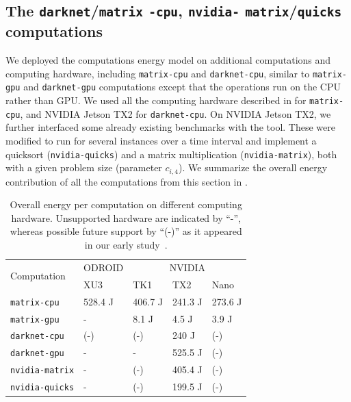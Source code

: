 \subsection{The {\tt darknet}/{\tt matrix} {\tt -cpu}, {\tt nvidia-} {\tt matrix}/{\tt quicks} computations}

We deployed the computations energy model on additional computations and computing hardware, including {\small\tt matrix-cpu} and {\small\tt darknet-cpu}, similar to {\small\tt matrix-gpu} and {\small\tt darknet-gpu} computations except that the operations run on the CPU rather than GPU. We used all the computing hardware described in  for {\small\tt matrix-cpu}, and NVIDIA Jetson TX2 for {\small\tt darknet-cpu}. On NVIDIA Jetson TX2, we further interfaced some already existing benchmarks with the \powprof{} tool. 
These were modified to run for several instances over a time interval and implement a quicksort ({\small\tt nvidia-quicks}) and a matrix multiplication ({\small\tt nvidia-matrix}), both with a given problem size (parameter $c_{i,4}$). We summarize the overall energy contribution of all the computations from this section in . 
\begin{table}[h]
  \footnotesize{}\selectfont
  \begin{tabularx}{\textwidth}{|l|*{3}{X|}X|}
    \hline
    \multirow{2}{*}{Computation} & ODROID & \multicolumn{3}{c|}{NVIDIA} \\
    & XU3 & TK1 & TX2 & Nano \\
    \hline
    {\small\tt matrix-cpu}    & 528.4 J & 406.7 J & 241.3 J & 273.6 J \\
    {\small\tt matrix-gpu}    & - & 8.1 J & 4.5 J & 3.9 J \\
    {\small\tt darknet-cpu}   & (-) & (-) & 240 J & (-) \\
    {\small\tt darknet-gpu}   & - & - & 525.5 J & (-) \\
    {\small\tt nvidia-matrix} & - & (-) & 405.4 J & (-) \\
    {\small\tt nvidia-quicks} & - & (-) & 199.5 J & (-) \\
    \hline
  \end{tabularx}
  \caption[Overall energy per computation on different computing hardware]{Overall energy per computation on different computing hardware. Unsupported hardware are indicated by ``-'', whereas possible future support by ``(-)'' as it appeared in our early study~\citep{seewald2019coarse}.}
  \label{tab:benchmark-components}
\end{table}
